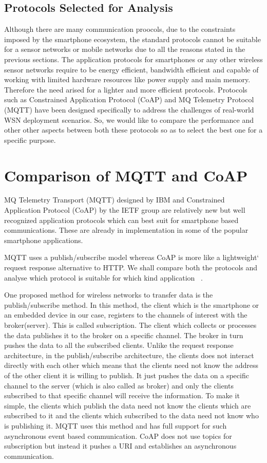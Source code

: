 \documentclass[conference]{IEEEtran}
\begin{document}
\subsection{Protocols Selected for Analysis}
Although there are many communication proocols, due to the constraints imposed by the smartphone ecosystem, the standard protocols cannot be suitable for a sensor networks or mobile networks due to all the reasons stated in the previous sections. The application protocols for smartphones or any other wireless sensor networks require to be energy efficient, bandwidth efficient and capable of working with limited hardware resources like power supply and main memory. Therefore the need arised for a lighter and more efficient protocols. Protocols such as Constrained Application Protocol (CoAP) and MQ Telemetry Protocol (MQTT) have been designed specifically to address the challenges of real-world WSN deployment scenarios. So, we would like to compare the performance and other other aspects between both these protocols so as to select the best one for a specific purpose.

\section{Comparison of MQTT and CoAP}
MQ Telemetry Transport (MQTT) designed by IBM and Constrained Application Protocol (CoAP) by the IETF group are relatively new but well recognized application protocols which can best suit for smartphone based communications. These are already in implementation in some of the popular smartphone applications.

MQTT uses a publish/subscribe model whereas CoAP is more like a lightweight`\cite{x4} request response alternative to HTTP. We shall compare both the protocols and analyse which protocol is suitable for which kind application ~\cite{iot2}.

One proposed method for wireless networks to transfer data is the publish/subscribe method. In this method, the client which is the smartphone or an embedded device in our case, registers to the channels of interest with the broker(server). This is called subscription. The client which collects or processes the data publishes it to the broker on a specific channel. The broker in turn pushes the data to all the subscribed clients. Unlike the request response architecture, in the publish/subscribe architecture, the clients does not interact directly with each other which means that the clients need not know the address of the other client it is willing to publish. It just pushes the data on a specific channel to the server (which is also called as broker) and only the clients subscribed to that specific channel will receive the information. To make it simple, the clients which publish the data need not know the clients which are subscribed to it and the clients which subscribed to the data need not know who is publishing it. MQTT uses this method and has full support for such asynchronous event based communication. CoAP does not use topics for subscription but instead it pushes a URI and establishes an asynchronous communication.
\end{document}
